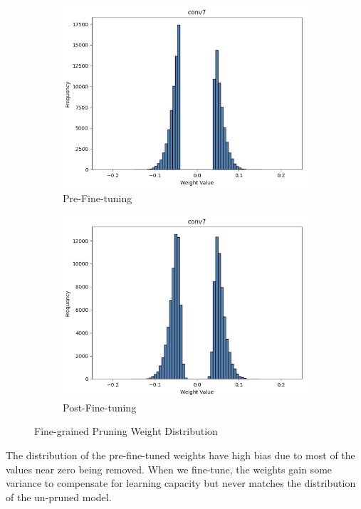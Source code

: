 \documentclass[12pt]{article}
\begin{document}
\begin{figure}[h]
\centering
\begin{subfigure}{.5\textwidth}
  \centering
  \includegraphics[width=1\linewidth]{report_images/finegrained_w_dist_pp.png}
  \caption{Pre-Fine-tuning}
  \label{fig:fine_dis_tt}
\end{subfigure}%
\begin{subfigure}{.5\textwidth}
  \centering
  \includegraphics[width=1\linewidth]{report_images/finegrained_w_dist_ft.png}
  \caption{Post-Fine-tuning}
  \label{fig:fine_dis_ft}
\end{subfigure}
\caption{Fine-grained Pruning Weight Distribution}
\label{fig:fine_w_dis}
\end{figure}
\noindent
The distribution of the pre-fine-tuned weights have high bias due to most of the values near zero being removed. When we fine-tune, the weights gain some variance to compensate for learning capacity but never matches the distribution of the un-pruned  model.
\end{document}
